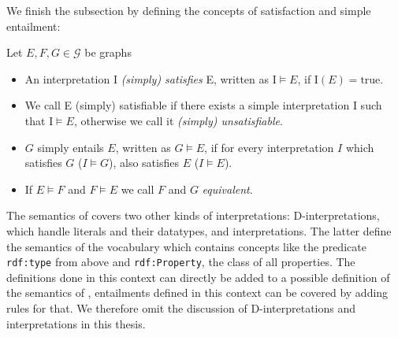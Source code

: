 We finish the subsection by defining the concepts of satisfaction and simple entailment:
\begin{definition}
Let $E,F,G\in \mathcal{G}$ be \rdf graphs
\begin{itemize}
\item An interpretation  $\mathrm{I}$ \emph{(simply) satisfies} E, written as $\mathrm{I}\models E$, if $\mathrm{I}(E)=\text{true}$.
\item We call E (simply) satisfiable if there exists a simple interpretation $\mathrm{I}$ such that $\mathrm{I}\models E$, otherwise we call it \emph{(simply) unsatisfiable}.
\item $G$ simply entails $E$, written as $G\models E$, if for every interpretation $I$ which satisfies $G$ ($I\models G$), also satisfies $E$ ($I\models E$). 
\item If $E\models F$ and $F\models E$ we call $F$ and $G$ \emph{equivalent}.
\end{itemize}
\end{definition}
% 
% 
% 
% 
% 
% 
% 
%  
The semantics of  \rdf covers two other kinds of interpretations: D-interpretations, which handle literals and their datatypes, and \rdf interpretations. The latter define the semantics
of the \rdf vocabulary which contains concepts like the  predicate \texttt{rdf:type} from above and \texttt{rdf:Property}, the class of all properties. The definitions done in this context can directly be added to a 
possible definition of the semantics of \nthree, entailments defined in this context can be covered by adding rules for that. We therefore omit the discussion of D-interpretations and \rdf interpretations in this thesis.



